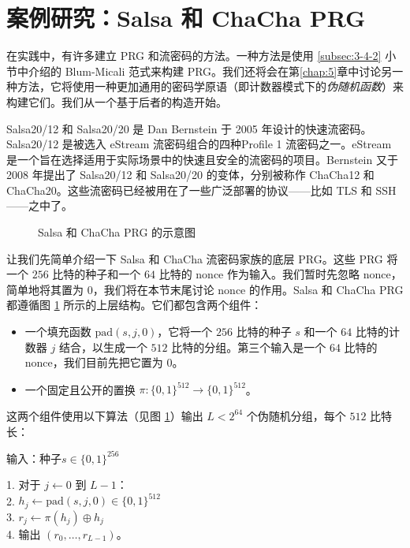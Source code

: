 \section{案例研究：Salsa 和 ChaCha PRG}\label{sec:3-6}

在实践中，有许多建立 PRG 和流密码的方法。一种方法是使用 \ref{subsec:3-4-2} 小节中介绍的 Blum-Micali 范式来构建 PRG。我们还将会在第\ref{chap:5}章中讨论另一种方法，它将使用一种更加通用的密码学原语（即计数器模式下的\emph{伪随机函数}）来构建它们。我们从一个基于后者的构造开始。

Salsa20/12 和 Salsa20/20 是 Dan Bernstein 于 2005 年设计的快速流密码。Salsa20/12 是被选入 eStream 流密码组合的四种Profile 1 流密码之一。eStream 是一个旨在选择适用于实际场景中的快速且安全的流密码的项目。Bernstein 又于 2008 年提出了 Salsa20/12 和 Salsa20/20 的变体，分别被称作 ChaCha12 和 ChaCha20。这些流密码已经被用在了一些广泛部署的协议——比如 TLS 和 SSH——之中了。

\begin{figure}
	\centering
	
	\caption{Salsa 和 ChaCha PRG 的示意图}
	\label{fig:3-8}
\end{figure}

让我们先简单介绍一下 Salsa 和 ChaCha 流密码家族的底层 PRG。这些 PRG 将一个 $256$ 比特的种子和一个 $64$ 比特的 nonce 作为输入。我们暂时先忽略 nonce，简单地将其置为 $0$，我们将在本节末尾讨论 nonce 的作用。Salsa 和 ChaCha PRG 都遵循图 \ref{fig:3-8} 所示的上层结构。它们都包含两个组件：
\begin{itemize}
	\item 一个填充函数 $\mathrm{pad}(s,j,0)$，它将一个 $256$ 比特的种子 $s$ 和一个 $64$ 比特的计数器 $j$ 结合，以生成一个 $512$ 比特的分组。第三个输入是一个 $64$ 比特的 nonce，我们目前先把它置为 $0$。
	\item 一个固定且公开的置换 $\pi:\{0,1\}^{512}\to\{0,1\}^{512}$。
\end{itemize}
这两个组件使用以下算法（见图 \ref{fig:3-8}）输出 $L<2^{64}$ 个伪随机分组，每个 $512$ 比特长：

\vspace*{10pt}

\hspace*{5pt} 输入：种子$s\in\{0,1\}^{256}$

\vspace*{5pt}

\hspace*{5pt} 1. \quad 对于 $j\leftarrow0$ 到 $L-1$：\\
\hspace*{26pt} 2. \quad\quad\quad\quad$h_j\leftarrow\mathrm{pad}(s,j,0)\in\{0,1\}^{512}$\\
\hspace*{26pt} 3. \quad\quad\quad\quad$r_j\leftarrow\pi(h_j)\oplus h_j$\\
\hspace*{26pt} 4. \quad 输出 $(r_0,\dots,r_{L-1})$。

